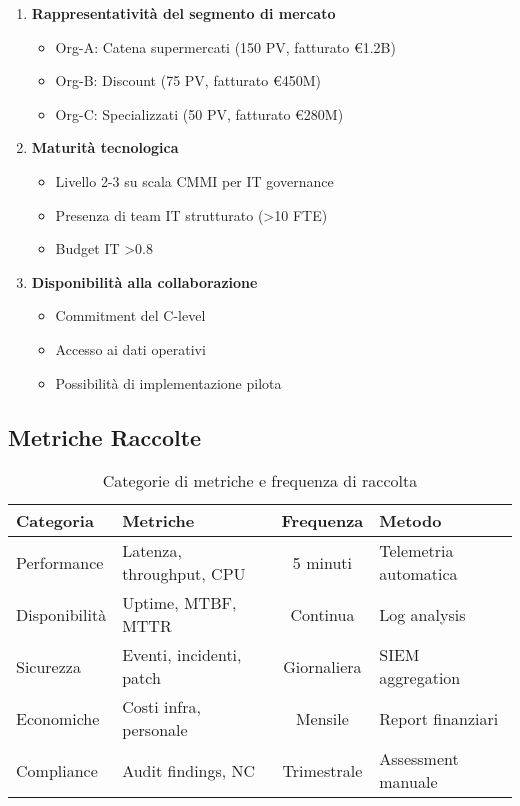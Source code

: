 \begin{enumerate}
    \item \textbf{Rappresentatività del segmento di mercato}
    \begin{itemize}
        \item Org-A: Catena supermercati (150 PV, fatturato €1.2B)
        \item Org-B: Discount (75 PV, fatturato €450M)
        \item Org-C: Specializzati (50 PV, fatturato €280M)
    \end{itemize}
    
    \item \textbf{Maturità tecnologica}
    \begin{itemize}
        \item Livello 2-3 su scala CMMI per IT governance
        \item Presenza di team IT strutturato (>10 FTE)
        \item Budget IT >0.8%
    \end{itemize}
    
    \item \textbf{Disponibilità alla collaborazione}
    \begin{itemize}
        \item Commitment del C-level
        \item Accesso ai dati operativi
        \item Possibilità di implementazione pilota
    \end{itemize}
\end{enumerate}

\subsection{\texorpdfstring{Metriche Raccolte}{A.2.2 - Metriche Raccolte}}

\begin{table}[htbp]
\centering
\caption{Categorie di metriche e frequenza di raccolta}
\begin{tabular}{|l|l|c|l|}
\hline
\textbf{Categoria} & \textbf{Metriche} & \textbf{Frequenza} & \textbf{Metodo} \\
\hline
Performance & Latenza, throughput, CPU & 5 minuti & Telemetria automatica \\
Disponibilità & Uptime, MTBF, MTTR & Continua & Log analysis \\
Sicurezza & Eventi, incidenti, patch & Giornaliera & SIEM aggregation \\
Economiche & Costi infra, personale & Mensile & Report finanziari \\
Compliance & Audit findings, NC & Trimestrale & Assessment manuale \\
\hline
\end{tabular}
\end{table}

